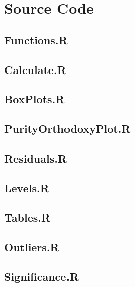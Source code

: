 \chapter{Source Code}

\section{Functions.R}\label{src:functions}


\section{Calculate.R}\label{src:calculate}


\section{BoxPlots.R}\label{src:boxPlots}


\section{PurityOrthodoxyPlot.R}\label{src:purityOrthodoxyPlot}


\section{Residuals.R}\label{src:residuals}


\section{Levels.R}\label{src:levels}


\section{Tables.R}\label{src:tables}


\section{Outliers.R}\label{src:outliers}


\section{Significance.R}\label{src:significance}

